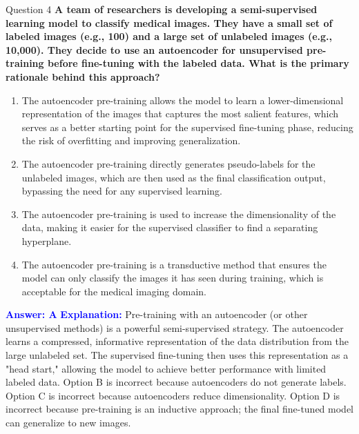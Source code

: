 \documentclass[8pt]{beamer}  %
\begin{document}
	\begin{frame}{Question 4}
		\textbf{A team of researchers is developing a semi-supervised learning model to classify medical images. They have a small set of labeled images (e.g., 100) and a large set of unlabeled images (e.g., 10,000). They decide to use an autoencoder for unsupervised pre-training before fine-tuning with the labeled data. What is the primary rationale behind this approach?}
		\begin{enumerate}
			\item The autoencoder pre-training allows the model to learn a lower-dimensional representation of the images that captures the most salient features, which serves as a better starting point for the supervised fine-tuning phase, reducing the risk of overfitting and improving generalization.
			\item The autoencoder pre-training directly generates pseudo-labels for the unlabeled images, which are then used as the final classification output, bypassing the need for any supervised learning.
			\item The autoencoder pre-training is used to increase the dimensionality of the data, making it easier for the supervised classifier to find a separating hyperplane.
			\item The autoencoder pre-training is a transductive method that ensures the model can only classify the images it has seen during training, which is acceptable for the medical imaging domain.
		\end{enumerate}
		\vspace{0.2cm}
		\textcolor{blue}{\textbf{Answer: A}}
		\vspace{0.2cm}
		\textcolor{blue}{\textbf{Explanation:}} Pre-training with an autoencoder (or other unsupervised methods) is a powerful semi-supervised strategy. The autoencoder learns a compressed, informative representation of the data distribution from the large unlabeled set. The supervised fine-tuning then uses this representation as a "head start," allowing the model to achieve better performance with limited labeled data. Option B is incorrect because autoencoders do not generate labels. Option C is incorrect because autoencoders reduce dimensionality. Option D is incorrect because pre-training is an inductive approach; the final fine-tuned model can generalize to new images.
	\end{frame}
	
\end{document}
